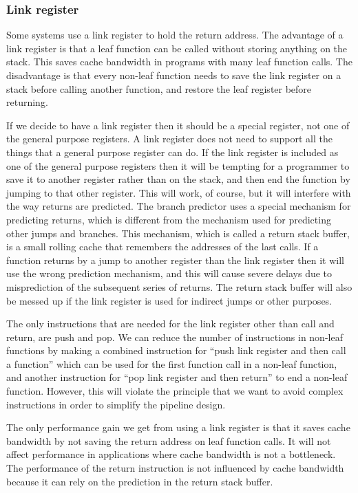 \documentclass[forwardcom.tex]{subfiles}
\begin{document}
\subsubsection{Link register}
Some systems use a link register to hold the return address. The advantage of a link register is that a leaf function can be called without storing anything on the stack. This saves cache bandwidth in programs with many leaf function calls. The disadvantage is that every non-leaf function needs to save the link register on a stack before calling another function, and restore the leaf register before returning.
\vspace{2mm}

If we decide to have a link register then it should be a special register, not one of the general purpose registers. A link register does not need to support all the things that a general purpose register can do. If the link register is included as one of the general purpose registers then it will be tempting for a programmer to save it to another register rather than on the stack, and then end the function by jumping to that other register. This will work, of course, but it will interfere with the way returns are predicted. The branch predictor uses a special mechanism for predicting returns, which is different from the mechanism used for predicting other jumps and branches. This mechanism, which is called a return stack buffer, is a small rolling cache that remembers the addresses of the last calls. If a function returns by a jump to another register than the link register then it will use the wrong prediction mechanism, and this will cause severe delays due to misprediction of the subsequent series of returns. The return stack buffer will also be messed up if the link register is used for indirect jumps or other purposes.
\vspace{2mm}

The only instructions that are needed for the link register other than call and return, are push and pop. We can reduce the number of instructions in non-leaf functions by making a combined instruction for ``push link register and then call a function'' which can be used for the first function call in a non-leaf function, and another instruction for ``pop link register and then return'' to end a non-leaf function. However, this will violate the principle that we want to avoid complex instructions in order to simplify the pipeline design.
\vspace{2mm}

The only performance gain we get from using a link register is that it saves cache bandwidth by not saving the return address on leaf function calls. It will not affect performance in applications where cache bandwidth is not a bottleneck. The performance of the return instruction is not influenced by cache bandwidth because it can rely on the prediction in the return stack buffer.
\vspace{2mm}
\end{document}
